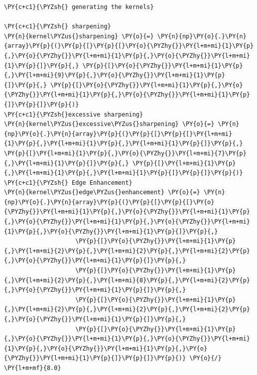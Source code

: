 \begin{tcolorbox}[breakable, size=fbox, boxrule=1pt, pad at break*=1mm,colback=cellbackground, colframe=cellborder]
	\begin{Verbatim}[commandchars=\\\{\}]
\PY{c+c1}{\PYZsh{} generating the kernels}

\PY{c+c1}{\PYZsh{} sharpening}
\PY{n}{kernel\PYZus{}sharpening} \PY{o}{=} \PY{n}{np}\PY{o}{.}\PY{n}{array}\PY{p}{(}\PY{p}{[}\PY{p}{[}\PY{o}{\PYZhy{}}\PY{l+m+mi}{1}\PY{p}{,}\PY{o}{\PYZhy{}}\PY{l+m+mi}{1}\PY{p}{,}\PY{o}{\PYZhy{}}\PY{l+m+mi}{1}\PY{p}{]}\PY{p}{,} \PY{p}{[}\PY{o}{\PYZhy{}}\PY{l+m+mi}{1}\PY{p}{,}\PY{l+m+mi}{9}\PY{p}{,}\PY{o}{\PYZhy{}}\PY{l+m+mi}{1}\PY{p}{]}\PY{p}{,} \PY{p}{[}\PY{o}{\PYZhy{}}\PY{l+m+mi}{1}\PY{p}{,}\PY{o}{\PYZhy{}}\PY{l+m+mi}{1}\PY{p}{,}\PY{o}{\PYZhy{}}\PY{l+m+mi}{1}\PY{p}{]}\PY{p}{]}\PY{p}{)}
\PY{c+c1}{\PYZsh{}excessive sharpening}
\PY{n}{kernel\PYZus{}excessive\PYZus{}sharpening} \PY{o}{=} \PY{n}{np}\PY{o}{.}\PY{n}{array}\PY{p}{(}\PY{p}{[}\PY{p}{[}\PY{l+m+mi}{1}\PY{p}{,}\PY{l+m+mi}{1}\PY{p}{,}\PY{l+m+mi}{1}\PY{p}{]}\PY{p}{,} \PY{p}{[}\PY{l+m+mi}{1}\PY{p}{,}\PY{o}{\PYZhy{}}\PY{l+m+mi}{7}\PY{p}{,}\PY{l+m+mi}{1}\PY{p}{]}\PY{p}{,} \PY{p}{[}\PY{l+m+mi}{1}\PY{p}{,}\PY{l+m+mi}{1}\PY{p}{,}\PY{l+m+mi}{1}\PY{p}{]}\PY{p}{]}\PY{p}{)}
\PY{c+c1}{\PYZsh{} Edge Enhancement}
\PY{n}{kernel\PYZus{}edge\PYZus{}enhancement} \PY{o}{=} \PY{n}{np}\PY{o}{.}\PY{n}{array}\PY{p}{(}\PY{p}{[}\PY{p}{[}\PY{o}{\PYZhy{}}\PY{l+m+mi}{1}\PY{p}{,}\PY{o}{\PYZhy{}}\PY{l+m+mi}{1}\PY{p}{,}\PY{o}{\PYZhy{}}\PY{l+m+mi}{1}\PY{p}{,}\PY{o}{\PYZhy{}}\PY{l+m+mi}{1}\PY{p}{,}\PY{o}{\PYZhy{}}\PY{l+m+mi}{1}\PY{p}{]}\PY{p}{,}
				    \PY{p}{[}\PY{o}{\PYZhy{}}\PY{l+m+mi}{1}\PY{p}{,}\PY{l+m+mi}{2}\PY{p}{,}\PY{l+m+mi}{2}\PY{p}{,}\PY{l+m+mi}{2}\PY{p}{,}\PY{o}{\PYZhy{}}\PY{l+m+mi}{1}\PY{p}{]}\PY{p}{,}
				    \PY{p}{[}\PY{o}{\PYZhy{}}\PY{l+m+mi}{1}\PY{p}{,}\PY{l+m+mi}{2}\PY{p}{,}\PY{l+m+mi}{8}\PY{p}{,}\PY{l+m+mi}{2}\PY{p}{,}\PY{o}{\PYZhy{}}\PY{l+m+mi}{1}\PY{p}{]}\PY{p}{,}
				    \PY{p}{[}\PY{o}{\PYZhy{}}\PY{l+m+mi}{1}\PY{p}{,}\PY{l+m+mi}{2}\PY{p}{,}\PY{l+m+mi}{2}\PY{p}{,}\PY{l+m+mi}{2}\PY{p}{,}\PY{o}{\PYZhy{}}\PY{l+m+mi}{1}\PY{p}{]}\PY{p}{,}
				    \PY{p}{[}\PY{o}{\PYZhy{}}\PY{l+m+mi}{1}\PY{p}{,}\PY{o}{\PYZhy{}}\PY{l+m+mi}{1}\PY{p}{,}\PY{o}{\PYZhy{}}\PY{l+m+mi}{1}\PY{p}{,}\PY{o}{\PYZhy{}}\PY{l+m+mi}{1}\PY{p}{,}\PY{o}{\PYZhy{}}\PY{l+m+mi}{1}\PY{p}{]}\PY{p}{]}\PY{p}{)} \PY{o}{/} \PY{l+m+mf}{8.0}
	\end{Verbatim}
\end{tcolorbox}

